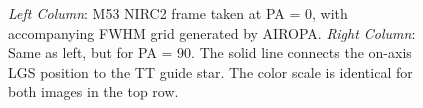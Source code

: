 \documentclass[]{spie}  %
\begin{document}
\begin{figure}[!h]
 \caption{\footnotesize \textit{Left Column}: M53 NIRC2 frame taken at PA = 0, with accompanying FWHM grid generated by AIROPA. \textit{Right Column}: Same as left, but for PA = 90. The solid line connects the on-axis LGS position to the TT guide star. The color scale is identical for both images in the top row.} \label{fig:m53_image_grid}
\end{figure}
\end{document}

